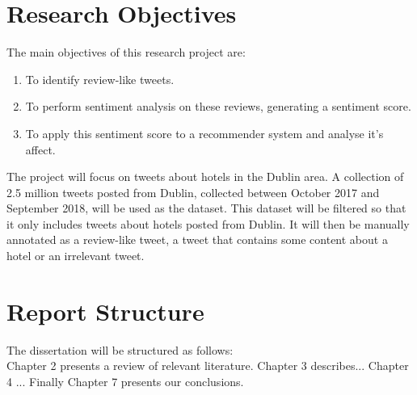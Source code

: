 \section{Research Objectives}
The main objectives of this research project are:
\begin{enumerate}
    \item To identify review-like tweets.
    \item To perform sentiment analysis on these reviews, generating a sentiment score.
    \item To apply this sentiment score to a recommender system and analyse it's affect.
\end{enumerate}
The project will focus on tweets about hotels in the Dublin area. A collection of 2.5 million tweets posted from Dublin, collected between October 2017 and September 2018, will be used as the dataset. This dataset will be filtered so that it only includes tweets about hotels posted from Dublin. It will then be manually annotated as a review-like tweet, a tweet that contains some content about a hotel or an irrelevant tweet.

\section{Report Structure}
The dissertation will be structured as follows:\\
Chapter 2 presents a review of relevant literature. Chapter 3 describes... Chapter 4 ... Finally Chapter 7 presents our conclusions.